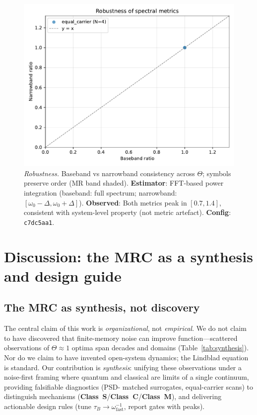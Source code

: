 \documentclass[11pt,letterpaper]{article}
\newcommand{\confighash}{c7dc5aa1}
\DeclareRobustCommand{\mrc}{\textbf{MRC}\xspace}
\DeclareRobustCommand{\classS}{\textbf{Class~S}\xspace}
\DeclareRobustCommand{\classC}{\textbf{Class~C}\xspace}
\DeclareRobustCommand{\classM}{\textbf{Class~M}\xspace}
\begin{document}
\begin{figure}[t]
\centering
\includegraphics[width=0.75\linewidth]{figC_robustness.pdf}
\caption{\label{fig:robustness}\emph{Robustness.} Baseband vs narrowband consistency across $\Theta$; symbols preserve order (MR band shaded). \textbf{Estimator}: FFT-based power integration (baseband: full spectrum; narrowband: $[\omega_0-\Delta,\omega_0+\Delta]$). \textbf{Observed}: Both metrics peak in $[0.7,1.4]$, consistent with system-level property (not metric artefact). \textbf{Config}: \texttt{\confighash}.}
\end{figure}

\clearpage
\section{Discussion: the \mrc as a synthesis and design guide}
\label{sec:discussion}

\subsection{The MRC as synthesis, not discovery}

The central claim of this work is \emph{organizational}, not 
\emph{empirical}. We do not claim to have discovered that finite-memory 
noise can improve function—scattered observations of $\Theta\approx 1$ 
optima span decades and domains (Table~\ref{tab:synthesis}). Nor do we 
claim to have invented open-system dynamics; the Lindblad equation is 
standard. Our contribution is \emph{synthesis}: unifying these 
observations under a noise-first framing where quantum and classical are 
limits of a single continuum, providing falsifiable diagnostics (PSD-
matched surrogates, equal-carrier scans) to distinguish mechanisms 
(\classS/\classC/\classM), and delivering actionable design rules (tune 
$\tau_B \to \omega_{\mathrm{fast}}^{-1}$, report gates with peaks).
\end{document}

